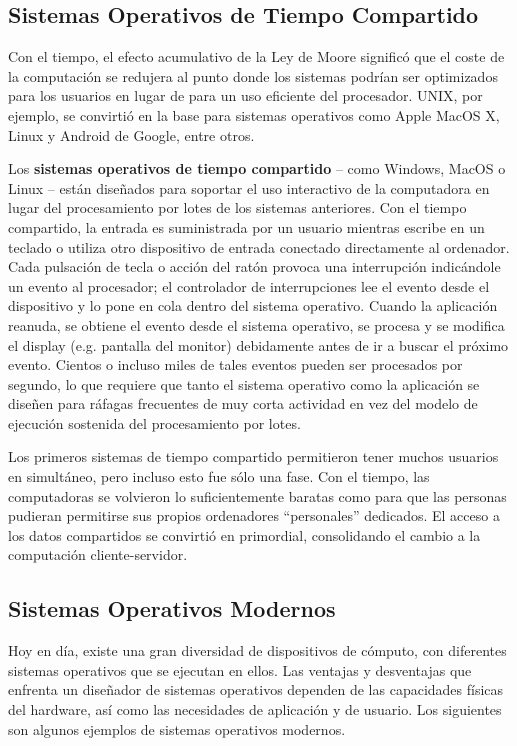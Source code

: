 \documentclass[10pt]{book}
\begin{document}
\subsection{Sistemas Operativos de Tiempo Compartido}
Con el tiempo, el efecto acumulativo de la Ley de Moore significó que el coste de la computación se redujera al punto donde los sistemas podrían ser optimizados para los usuarios en lugar de para un uso eficiente del procesador. UNIX, por ejemplo, se convirtió en la base para sistemas operativos como Apple MacOS X, Linux y Android de Google, entre otros.

Los \textbf{sistemas operativos de tiempo compartido} -- como Windows, MacOS o Linux -- están diseñados para soportar el uso interactivo de la computadora en lugar del procesamiento por lotes de los sistemas anteriores. Con el tiempo compartido, la entrada es suministrada por un usuario mientras escribe en un teclado o utiliza otro dispositivo de entrada conectado directamente al ordenador. Cada pulsación de tecla o acción del ratón provoca una interrupción indicándole un evento al procesador; el controlador de interrupciones lee el evento desde el dispositivo y lo pone en cola dentro del sistema operativo. Cuando la aplicación reanuda, se obtiene el evento desde el sistema operativo, se procesa y se modifica el display (e.g. pantalla del monitor) debidamente antes de ir a buscar el próximo evento. Cientos o incluso miles de tales eventos pueden ser procesados por segundo, lo que requiere que tanto el sistema operativo como la aplicación se diseñen para ráfagas frecuentes de muy corta actividad en vez del modelo de ejecución sostenida del procesamiento por lotes.

Los primeros sistemas de tiempo compartido permitieron tener muchos usuarios en simultáneo, pero incluso esto fue sólo una fase. Con el tiempo, las computadoras se volvieron lo suficientemente baratas como para que las personas pudieran permitirse sus propios ordenadores ``personales'' dedicados. El acceso a los datos compartidos se convirtió en primordial, consolidando el cambio a la computación cliente-servidor.


\subsection{Sistemas Operativos Modernos}
Hoy en día, existe una gran diversidad de dispositivos de cómputo, con diferentes sistemas operativos que se ejecutan en ellos. Las ventajas y desventajas que enfrenta un diseñador de sistemas operativos dependen de las capacidades físicas del hardware, así como las necesidades de aplicación y de usuario. Los siguientes son algunos ejemplos de sistemas operativos modernos.
\end{document}
